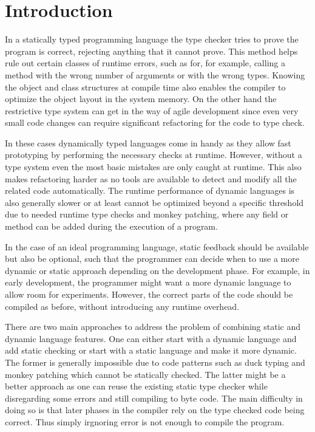  \section{Introduction}

 In a statically typed programming language the type checker tries to prove the program is correct, rejecting anything that it cannot prove. This method helps rule out certain classes of runtime errors, such as for, for example, calling a method with the wrong number of arguments or with the wrong types. Knowing the object and class structures at compile time also enables the compiler to optimize the object layout in the system memory. On the other hand the restrictive type system can get in the way of agile development since even very small code changes can require significant refactoring for the code to type check.

 In these cases dynamically typed languages come in handy as they allow fast prototyping by performing the necessary checks at runtime. However, without a type system even the most basic mistakes are only caught at runtime. This also makes refactoring harder as no tools are available to detect and modify all the related code automatically. The runtime performance of dynamic languages is also generally slower or at least cannot be optimized beyond a specific threshold due to needed runtime type checks and monkey patching, where any field or method can be added during the execution of a program. 

  In the case of an ideal programming language, static feedback should be available but also be optional, such that the programmer can decide when to use a more dynamic or static approach depending on the development phase. For example, in early development, the programmer might want a more dynamic language to allow room for experiments. However, the correct parts of the code should be compiled as before, without introducing any runtime overhead.

  There are two main approaches to address the problem of combining static and dynamic language features. One can either start with a dynamic language and add static checking or start with a static language and make it more dynamic. The former is generally impossible due to code patterns such as duck typing and monkey patching which cannot be statically checked. The latter might be a better approach as one can reuse the existing static type checker while disregarding some errors and still compiling to byte code. The main difficulty in doing so is that later phases in the compiler rely on the type checked code being correct. Thus simply irgnoring error is not enough to compile the program.

